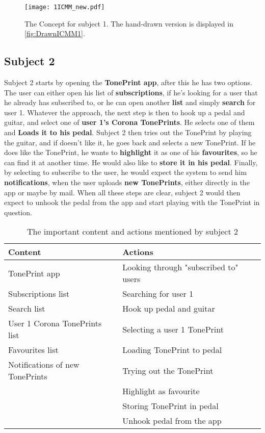 %
\begin{figure}[H]
	\centering
	\texttt{[image: 1ICMM\_new.pdf]}
	\caption{The Concept for subject 1. The hand-drawn version is displayed in \autoref{fig:DrawnICMM1}.}
	\label{fig:ICMM1}
\end{figure}


\subsection*{Subject 2}
\label{Subject2}
Subject 2 starts by opening the \textbf{TonePrint app}, after this he has two options. The user can either open his list of \textbf{subscriptions}, if he's looking for a user that he already has subscribed to, or he can open another \textbf{list} and simply \textbf{search} for user 1. Whatever the approach, the next step is then to hook up a pedal and guitar, and select one of \textbf{user 1's Corona TonePrints}. He selects one of them and \textbf{Loads it to his pedal}. Subject 2 then tries out the TonePrint by playing the guitar, and if doesn't like it, he goes back and selects a new TonePrint. If he does like the TonePrint, he wants to \textbf{highlight} it as one of his \textbf{favourites}, so he can find it at another time. He would also like to \textbf{store it in his pedal}. Finally, by selecting to subscribe to the user, he would expect the system to send him \textbf{notifications}, when the user uploads \textbf{new TonePrints}, either directly in the app or maybe by mail. When all these steps are clear, subject 2 would then expect to unhook the pedal from the app and start playing with the TonePrint in question. \\
%
\begin{table}[H]
\begin{minipage}[b]{\linewidth}\centering
	\begin{tabular} {|l|l|l|} \hline
		\rowcolor{xGray25} \textbf{Content} & \textbf{Actions} \\  \hline
		TonePrint app & Looking through "subscribed to" users \\
		Subscriptions list & Searching for user 1 \\
		Search list & Hook up pedal and guitar \\
		User 1 Corona TonePrints list & Selecting a user 1 TonePrint \\
		Favourites list & Loading TonePrint to pedal \\
		Notifications of new TonePrints & Trying out the TonePrint \\
		 & Highlight as favourite \\
		 & Storing TonePrint in pedal \\
		 & Unhook pedal from the app \\ \hline
	\end{tabular}
	\caption{The important content and actions mentioned by subject 2}
	\label{tab:Subject2ContentActions}
\end{minipage}
\end{table}
